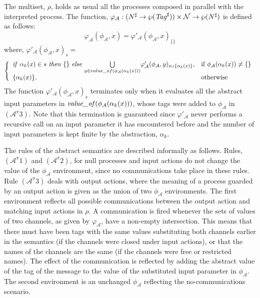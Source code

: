 \documentclass[10pt,a4paper,final,oneside,fleqn]{book}
\begin{document}
\noindent
The multiset, $\rho$, holds as usual all the processes composed in parallel with the interpreted process.  The function, $\varphi_\mathcal{A}:(N^\sharp\to\wp(\mbox{{\itshape Tag\/}}^\sharp))\times\mathcal{N}\to\wp(N^\sharp)$ is defined as follows:
\[\varphi_\mathcal{A}(\phi_\mathcal{A}, x)=\varphi'_\mathcal{A}(\phi_\mathcal{A}, x)_{\{\}}\] where, $\varphi'_\mathcal{A}(\phi_\mathcal{A}, x)_{s}=$\[\left\{\begin{array}{ll}
\mbox{{\itshape if\/} }\alpha_k(x)\in s\mbox{ {\itshape then\/} }\{\}\mbox{ {\itshape else\/} }\underset{y\in value\_of(\phi_\mathcal{A}(\alpha_k(x)))}{\bigcup}\varphi'_\mathcal{A}(\phi_\mathcal{A},y)_{s\cup\{\alpha_k(x)\}},&\mbox{if }\phi_\mathcal{A}(\alpha_k(x))\ne\{\}\\
\{\alpha_k(x)\},&\mbox{otherwise}\end{array}\right.\]
The function $\varphi'_\mathcal{A}(\phi_\mathcal{A},x)_s$ terminates only when it evaluates all the abstract input parameters in $\mbox{{\itshape value\_of\/}}(\phi_\mathcal{A}(\alpha_k(x)))$, whose tags were added to $\phi_\mathcal{A}$ in $(\mathcal{A}^\pi 3)$.  Note that this termination is guaranteed since $\varphi'_\mathcal{A}$ never performs a recursive call on an input parameter it has encountered before and the number of input parameters is kept finite by the abstraction, $\alpha_k$.

The rules of the abstract semantics are described informally as follows.  Rules, $(\mathcal{A}^\pi 1)$ and $(\mathcal{A}^\pi 2)$, for null processes and input actions do not change the value of the $\phi_\mathcal{A}$ environment, since no communications take place in these rules. Rule $(\mathcal{A}^\pi 3)$ deals with output actions, where the meaning of a process guarded by an output action is given as the union of two $\phi_\mathcal{A}$ environments.  The first environment reflects all possible communications between the output action and matching input actions in $\rho$.  A communication is fired whenever the sets of values of two channels, as given by $\varphi_\mathcal{A}$, have a non-empty intersection. This means that there must have been tags with the same values substituting both channels earlier in the semantics (if the channels were closed under input actions), or that the names of the channels are the same (if the channels were free or restricted names).  The effect of the communication is reflected by adding the abstract value of the tag of the message to the value of the substituted input parameter in $\phi_\mathcal{A}$.  The second environment is an unchanged $\phi_\mathcal{A}$ reflecting the no-communications scenario.
\end{document}
